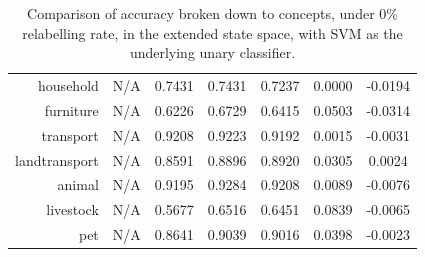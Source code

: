 \documentclass[11pt,a4paper]{book}
\begin{document}
\begin{table}[htbp]
\begin{tabular}{r|c|c|c|c|c|c}
household     & N/A    & 0.7431 & 0.7431 & 0.7237 & 0.0000 & -0.0194\\
furniture     & N/A    & 0.6226 & 0.6729 & 0.6415 & 0.0503 & -0.0314\\
transport     & N/A    & 0.9208 & 0.9223 & 0.9192 & 0.0015 & -0.0031\\
landtransport & N/A    & 0.8591 & 0.8896 & 0.8920 & 0.0305 & 0.0024\\
animal        & N/A    & 0.9195 & 0.9284 & 0.9208 & 0.0089 & -0.0076\\
livestock     & N/A    & 0.5677 & 0.6516 & 0.6451 & 0.0839 & -0.0065\\
pet           & N/A    & 0.8641 & 0.9039 & 0.9016 & 0.0398 & -0.0023
\end{tabular}
\caption{Comparison of accuracy broken down to concepts, under 0\% relabelling rate, in the extended state space, with SVM as the underlying unary classifier.}
\label{tab:svm0acc}
\end{table}
\end{document}

